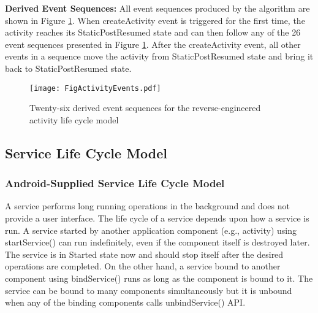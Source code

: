 \documentclass[10pt]{elsarticle}
\begin{document}
{\noindent \bf{Derived Event Sequences:}}  All event sequences produced by the algorithm are shown in Figure \ref{activityEvents}. When createActivity event is triggered for the first time, the activity reaches its StaticPostResumed state and can then follow any of the 26 event sequences presented in Figure \ref{activityEvents}. After the createActivity event, all other events in a sequence move the activity from StaticPostResumed state and bring it back to StaticPostResumed state. 


\begin{figure}[ht]
\centering
\texttt{[image: FigActivityEvents.pdf]}
\caption{Twenty-six derived event sequences for the reverse-engineered activity life cycle model}
\label{activityEvents}
\end{figure}


\tikzset{>=latex}





\subsection{Service Life Cycle Model} \label{serviceLCM}

\subsubsection{Android-Supplied Service Life Cycle Model}

A service performs long running operations in the background and does not provide a user interface. The life cycle of a service \cite{service} depends upon how a service is run. A service started by another application component (e.g., activity) using {\ttfamily startService()} can run indefinitely, even if the component itself is destroyed later. The service is in Started state now and should stop itself after the desired operations are completed. On the other hand, a service bound to another component using {\ttfamily bindService()} runs as long as the component is bound to it. The service can be bound to many components simultaneously but it is unbound when any of the binding components calls {\ttfamily unbindService()} API. 
\end{document}
